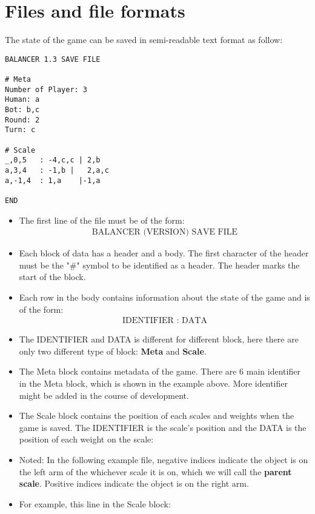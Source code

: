 \documentclass[12pt]{article}
\begin{document}
\section{Files and file formats}
The state of the game can be saved in semi-readable text format as follow:
\begin{verbatim}
BALANCER 1.3 SAVE FILE

# Meta
Number of Player: 3
Human: a
Bot: b,c
Round: 2
Turn: c

# Scale
_,0,5   : -4,c,c | 2,b
a,3,4   : -1,b |   2,a,c
a,-1,4  : 1,a    |-1,a

END

\end{verbatim}

\begin{itemize}
  \item The first line of the file must be of the form: 
    \begin{align*}
      \text{BALANCER (VERSION) SAVE FILE}
    \end{align*}
  \item Each block of data has a header and a body. The first character of the
    header must be the "\#" symbol to be identified as a header. The header
    marks the start of the block.
  \item Each row in the body contains information about the state of the game
    and is of the form:
    \begin{align*}
      \text{IDENTIFIER : DATA}
    \end{align*}
    \item The IDENTIFIER and DATA is different for different block, here there
      are only two different type of block: \textbf{Meta} and \textbf{Scale}.
  \item The Meta block contains metadata of the game. There are 6 main
    identifier in the Meta block, which is shown in the example above. More
    identifier might be added in the course of development. 
  \item The Scale block contains the position of each scales and weights when
    the game is saved. The IDENTIFIER is the scale's position and the DATA is
    the position of each weight on the scale:
  \item Noted: In the following example file, negative indices indicate the
    object is on the left arm of the whichever scale it is on, which we will
    call the \textbf{parent scale}.  Positive indices indicate the object is on
    the right arm.
  \item For example, this line in the Scale block:

\end{itemize}
\end{document}
